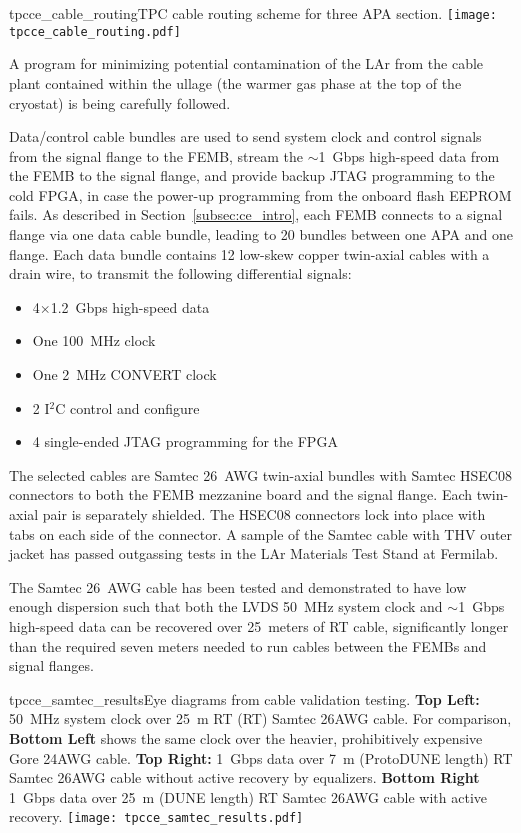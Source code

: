 \begin{cdrfigure}{tpcce_cable_routing}{TPC cable routing scheme for three APA section.}
\texttt{[image: tpcce\_cable\_routing.pdf]}
\end{cdrfigure}

A program for minimizing potential contamination of the LAr from the cable plant contained within the ullage
(the warmer gas phase at the top of the cryostat) 
is being carefully followed.


Data/control cable bundles are used to send system clock and control signals from the 
signal flange to the FEMB, stream the $\sim$1~Gbps high-speed data from the FEMB to the signal flange, and 
provide backup JTAG programming to the cold FPGA, in case the power-up programming from the onboard 
flash EEPROM fails. As described in Section~\ref{subsec:ce_intro}, each FEMB 
connects to a signal flange via one data cable bundle, leading to 20 bundles between one APA and one flange.
Each data bundle contains 12 low-skew copper twin-axial cables with a drain wire, 
to transmit the following differential signals:

\begin{itemize}
    \item 4$\times$1.2~Gbps high-speed data
    \item One 100~MHz clock
    \item One 2~MHz CONVERT clock
    \item 2 I$^2$C control and configure
    \item 4 single-ended JTAG programming for the FPGA
\end{itemize}

The selected cables are Samtec 26~AWG twin-axial bundles with Samtec HSEC08 connectors to both
the FEMB mezzanine board and the signal flange. Each twin-axial pair is separately shielded.
The HSEC08
connectors lock into place with tabs on each side of the connector. A sample of the Samtec cable with
THV outer jacket has passed outgassing tests in the LAr Materials Test Stand at Fermilab.

The Samtec 26~AWG cable has been
tested and demonstrated to have low enough dispersion such that both the LVDS 50~MHz system clock and
$\sim$1~Gbps high-speed data can be recovered over 25~meters of RT cable, 
significantly longer than the required seven meters needed to run cables between the FEMBs and signal flanges.

\begin{cdrfigure}{tpcce_samtec_results}{Eye diagrams 
from cable validation testing. {\bf Top Left:} 50~MHz system clock over 25~m RT  
(RT) Samtec 26AWG cable. For comparison, {\bf Bottom Left} shows the same clock over 
the heavier, prohibitively expensive Gore 24AWG cable. {\bf Top Right:} 1~Gbps data over 
7~m (ProtoDUNE length) RT Samtec 26AWG cable without active recovery by equalizers. {\bf Bottom Right} 1~Gbps
data over 25~m (DUNE length) RT Samtec 26AWG cable with active recovery.}
\texttt{[image: tpcce\_samtec\_results.pdf]}
\end{cdrfigure}

